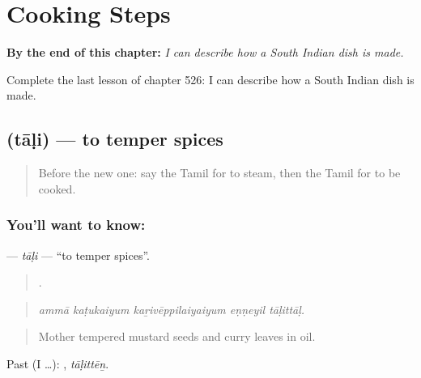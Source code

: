 
\chapter{Cooking Steps}
\label{ch:ta-cooking-steps}

\begin{chapteropening}
\textbf{By the end of this chapter:} \emph{I can describe how a South Indian dish is made.}

Complete the last lesson of chapter 526: I can describe how a South Indian dish is made.
\end{chapteropening}

\section[\texorpdfstring{\ta{தாளி} (tāḷi)}{தாளி (tāḷi)}]{ (tāḷi) — to temper spices}

\label{lesson:TA-C526-tali}



\begin{quote}
Before the new one: say the Tamil for to steam, then the Tamil for to be cooked.
\end{quote}

\subsection*{You'll want to know: }
\textbf{} — \emph{tāḷi} — \textquotedblleft{}to temper spices\textquotedblright{}.

\begin{quote}
    .
\end{quote}

\begin{quote}
\emph{ammā kaṭukaiyum kaṟivēppilaiyaiyum eṇṇeyil tāḷittāḷ.}
\end{quote}

\begin{quote}
Mother tempered mustard seeds and curry leaves in oil.
\end{quote}

Past (I …): , \emph{tāḷittēṉ}.

